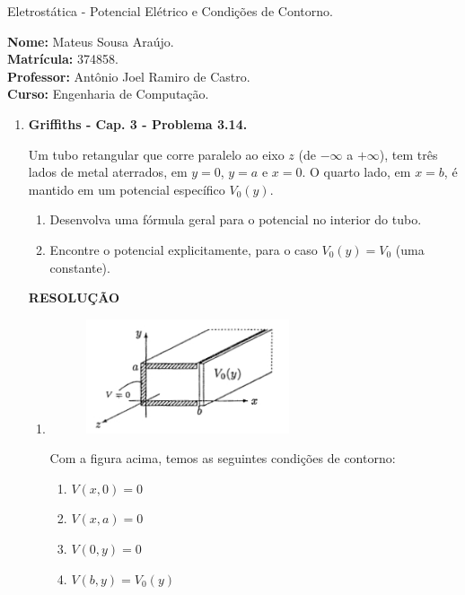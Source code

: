 \documentclass[11pt,a4paper]{article}
\begin{document}
	\begin{center}
		\Large Eletrostática - Potencial Elétrico e Condições de Contorno. 
	\end{center}

\begin{flushleft}
\textbf{Nome:} Mateus Sousa Araújo. \\
\textbf{Matrícula:} 374858. \\
\textbf{Professor:} Antônio Joel Ramiro de Castro. \\
\textbf{Curso:} Engenharia de Computação. \\
\end{flushleft}

\begin{enumerate}

\item \textbf{Griffiths - Cap. 3 - Problema 3.14.}

Um tubo retangular que corre paralelo ao eixo $z$ (de $-\infty$ a $+\infty$), tem três lados de metal aterrados, em $y = 0$, $y = a$ e $x = 0$. O quarto lado, em $x = b$, é mantido em um potencial específico $V_0(y)$.

\begin{enumerate}
\item Desenvolva uma fórmula geral para o potencial no interior do tubo.
\item Encontre o potencial explicitamente, para o caso $V_0(y) = V_0$ (uma constante).
\end{enumerate}


\textbf{RESOLUÇÃO}

\begin{enumerate}

\item 

\begin{figure}[h]	
\centering %
\includegraphics[width=6cm]{Selection_084.jpg} 
\end{figure}

Com a figura acima, temos as seguintes condições de contorno:

\begin{enumerate}
\item $V(x,0) = 0$
\item $V(x,a) = 0$
\item $V(0,y) = 0$
\item $V(b,y) = V_0(y)$
\end{enumerate}


\end{enumerate}
\end{enumerate}
\end{document}
